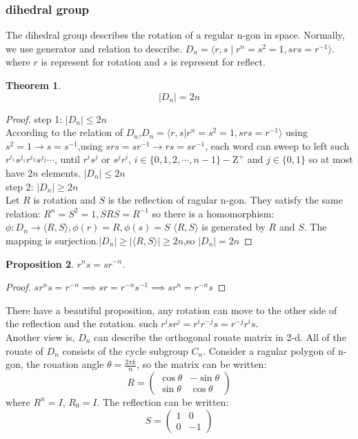 \documentclass[10pt,a4paper]{article}
\newtheorem{theorem}{Theorem}[section]
\newtheorem{proposition}[theorem]{Proposition}
\begin{document}
\subsubsection{dihedral group}
The dihedral group describes the rotation of a regular n-gon in space. Normally, we use generator and relation to describe.
$D_n=\langle r,s\mid r^n=s^2=1,srs=r^{-1}\rangle$. where $r$ is represent for rotation and $s$ is represent for reflect. 
\begin{theorem}
    \[|D_n|=2n\]
\end{theorem}
\begin{proof}
    step 1: $|D_n|\le 2n$\\
    According to the relation of $D_n$,$D_n=\langle r,s|r^n=s^2=1,srs=r^{-1}\rangle$
    using $s^2=1\to s=s^{-1}$,using $srs=sr^{-1}\to rs=sr^{-1}$, each word can sweep to left such $r^{i_1}s^{j_1}r^{i_2}s^{j_2}\cdots$,
    until $r^is^j$ or $s^jr^i$, $i\in\{0,1,2,\cdots,n-1\}-\mathrm{Z}^+$ and $j\in\{0,1\}$ so at most have $2n$ elements. $|D_n|\le 2n$\\
    step 2: $|D_n|\ge2n$\\
    Let $R$ is rotation and $S$ is the reflection of ragular n-gon. They satisfy the same relation:
    $R^n=S^2=1,SRS=R^{-1}$
    so there is a homomorphism:
    $\phi:D_n\to\langle R,S\rangle,\phi(r)=R,\phi(s)=S$
    $\langle R,S\rangle$ is generated by $R$ and $S$. The mapping is surjection.$|D_n|\ge|\langle R,S\rangle|\ge 2n$,so $|D_n|=2n$
\end{proof}
\begin{proposition}
    $r^ns=sr^{-n}$. 
\end{proposition}
\begin{proof}
    $sr^{n}s=r^{-n}\implies sr=r^{-n}s^{-1}\implies sr^n=r^{-n}s$
\end{proof}
There have a beautiful proposition, any rotation can move to the other side of the reflection and the rotation. such $r^isr^j=r^ir^{-j}s=r^{-j}r^{i}s$.\\
Another view is, $D_n$ can describe the orthogonal rouate matrix in 2-d. All of the rouate of $D_n$ consists of the cycle subgroup $C_n$.
Consider a ragular polygon of n-gon, the rouation angle $\theta=\frac{2\pi k}{n}$, so the matrix can be written:
\[R=\begin{pmatrix}\cos\theta&-\sin\theta\\\sin\theta&\cos\theta\end{pmatrix}\]
where $R^n=I$, $R_0=I$. The reflection can be written:
\[S=\begin{pmatrix}1&0\\0&-1\end{pmatrix}\]
\end{document}

